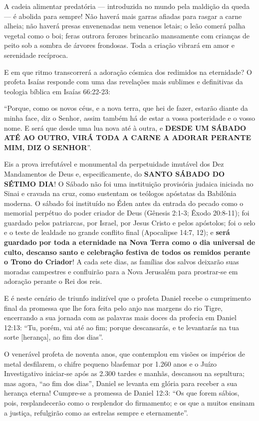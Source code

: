 A cadeia alimentar predatória — introduzida no mundo pela maldição da queda — é abolida para sempre! Não haverá mais garras afiadas para rasgar a carne alheia; não haverá presas envenenadas nem venenos letais; o leão comerá palha vegetal como o boi; feras outrora ferozes brincarão mansamente com crianças de peito sob a sombra de árvores frondosas. Toda a criação vibrará em amor e serenidade recíproca.

E em que ritmo transcorrerá a adoração cósmica dos redimidos na eternidade?
O profeta Isaías responde com uma das revelações mais sublimes e definitivas da teologia bíblica em Isaías 66:22-23:

``Porque, como os novos céus, e a nova terra, que hei de fazer, estarão diante da minha face, diz o Senhor, assim também há de estar a vossa posteridade e o vosso nome. E será que desde uma lua nova até à outra, e \textbf{DESDE UM SÁBADO ATÉ AO OUTRO, VIRÁ TODA A CARNE A ADORAR PERANTE MIM, DIZ O SENHOR}''.

Eis a prova irrefutável e monumental da perpetuidade imutável dos Dez Mandamentos de Deus e, especificamente, do \textbf{SANTO SÁBADO DO SÉTIMO DIA}!
O Sábado não foi uma instituição provisória judaica iniciada no Sinai e cravada na cruz, como sustentam os teólogos apóstatas da Babilônia moderna. O sábado foi instituído no Éden antes da entrada do pecado como o memorial perpétuo do poder criador de Deus (Gênesis 2:1-3; Êxodo 20:8-11); foi guardado pelos patriarcas, por Israel, por Jesus Cristo e pelos apóstolos; foi o selo e o teste de lealdade no grande conflito final (Apocalipse 14:7, 12); e \textbf{será guardado por toda a eternidade na Nova Terra como o dia universal de culto, descanso santo e celebração festiva de todos os remidos perante o Trono do Criador}! A cada sete dias, as famílias dos salvos deixarão suas moradas campestres e confluirão para a Nova Jerusalém para prostrar-se em adoração perante o Rei dos reis.

E é neste cenário de triunfo indizível que o profeta Daniel recebe o cumprimento final da promessa que lhe fora feita pelo anjo nas margens do rio Tigre, encerrando a sua jornada com as palavras mais doces da profecia em Daniel 12:13:
``Tu, porém, vai até ao fim; porque descansarás, e te levantarás na tua sorte [herança], ao fim dos dias''.

O venerável profeta de noventa anos, que contemplou em visões os impérios de metal desfilarem, o chifre pequeno blasfemar por 1.260 anos e o Juízo Investigativo iniciar-se após as 2.300 tardes e manhãs, descansou na sepultura; mas agora, ``ao fim dos dias'', Daniel se levanta em glória para receber a sua herança eterna! Cumpre-se a promessa de Daniel 12:3:
``Os que forem sábios, pois, resplandecerão como o resplendor do firmamento; e os que a muitos ensinam a justiça, refulgirão como as estrelas sempre e eternamente''.



